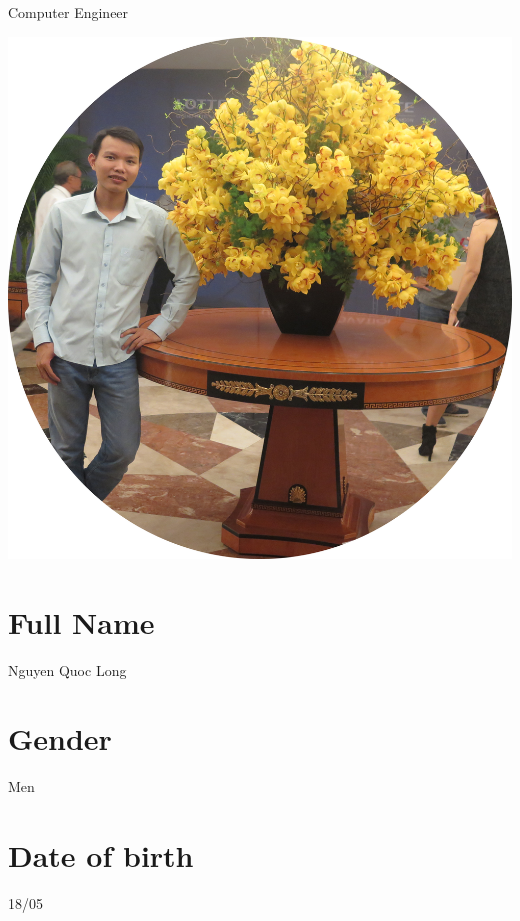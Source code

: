 \documentclass[]{friggeri-cv}
\begin{document}
      {Computer Engineer}
      


\begin{aside}
  \includegraphics[scale=0.1]{img/kalog-noedit.jpg}
  \section{Full Name}
Nguyen Quoc Long
  \section{Gender}
Men
  \section{Date of birth}
	18/05
~
~
~
~

\end{aside}
\end{document}
